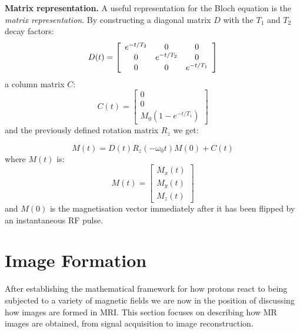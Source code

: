 \hfill

\textbf{Matrix representation.}\label{app:matrixbloch} A useful representation for the Bloch equation is the \textit{matrix representation}.
By constructing a diagonal matrix $D$ with the $T_1$ and $T_2$ decay factors:
\begin{equation}
    D ( t ) = \left[
    \begin{array}{c c c}
          e^{-t/T_2} &     0      &     0 \\
              0      & e^{-t/T_2} &     0 \\
              0      &     0      & e^{-t/T_1}
    \end{array}
    \right]
\end{equation}
a column matrix $C$:
\begin{equation}
    C ( t ) = \left[
    \begin{array}{c}
        0 \\
        0 \\
    M_0(1 - e^{-t/T_1})
    \end{array}
    \right]
\end{equation}
and the previously defined rotation matrix $R_z$ we get:

\begin{equation} \label{eq:444}
    M(t) = D(t) R_z(-\omega_0 t) M(0) + C(t)
\end{equation}
where $M(t)$ is:
\begin{equation}
    M ( t ) = \left[
    \begin{array}{c}
        M_x(t) \\
        M_y(t) \\
        M_z(t)
    \end{array}
    \right]
\end{equation}
and $M(0)$ is the magnetisation vector immediately after it has been flipped by an instantaneous RF pulse.

\section{Image Formation}\label{chapterlabel2sec12}
After establishing the mathematical framework for how protons react to being subjected to a variety of magnetic fields we are now in the position of discussing how images are formed in MRI.
This section focuses on describing how MR images are obtained, from signal acquisition to image reconstruction. 

\hfill

